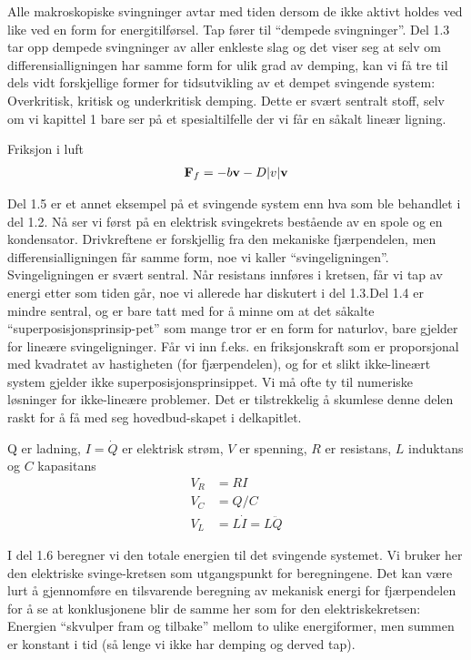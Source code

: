 \documentclass[12pt]{article}
\numberwithin{equation}{section}
\numberwithin{figure}{section}
\DeclarePairedDelimiter\abs{\lvert}{\rvert}%
\newcommand{\ma}[1]{$#1$}
\newcommand{\eq}[1]{{\small\begin{align}#1\end{align}}}
\renewcommand\vec[1]{\mathbf{#1}}
\begin{document}
Alle makroskopiske svingninger avtar med tiden dersom de ikke aktivt holdes ved like ved en form for energitilførsel. Tap fører til “dempede svingninger”. Del 1.3 tar opp dempede svingninger av aller enkleste slag og det viser seg at selv om differensialligningen har samme form for ulik grad av demping, kan vi få tre til dels vidt forskjellige former for tidsutvikling av et dempet svingende system: Overkritisk, kritisk og underkritisk demping. Dette er svært sentralt stoff, selv om vi kapittel 1 bare ser på et spesialtilfelle der vi får en såkalt lineær ligning. 

\begin{tcolorbox}[title = Del 1.3 -- Dempede svinginger,breakable]
   Friksjon i luft
  \eq{\vec F_f = -b\vec v- D\abs v \vec v }
\end{tcolorbox}

Del 1.5 er et annet eksempel på et svingende system enn hva som ble behandlet i del 1.2. Nå ser vi først på en elektrisk svingekrets bestående av en spole og en kondensator. Drivkreftene er forskjellig fra den mekaniske fjærpendelen, men differensialligningen får samme form, noe vi kaller “svingeligningen”. Svingeligningen er svært sentral. Når resistans innføres i kretsen, får vi tap av energi etter som tiden går, noe vi allerede har diskutert i del 1.3.Del 1.4 er mindre sentral, og er bare tatt med for å minne om at det såkalte “superposisjonsprinsip-pet” som mange tror er en form for naturlov, bare gjelder for lineære svingeligninger. Får vi inn f.eks. en friksjonskraft som er proporsjonal med kvadratet av hastigheten (for fjærpendelen),  og for et slikt ikke-lineært system gjelder ikke superposisjonsprinsippet. Vi må ofte ty til numeriske løsninger for ikke-lineære problemer. Det er tilstrekkelig å skumlese denne delen raskt for å få med seg hovedbud-skapet i delkapitlet.

\begin{tcolorbox}[title = Del 1.5 -- Elektriske svingninger,breakable]
   Q er ladning, \ma{I=\dot Q} 
   er elektrisk strøm, \ma V er spenning, \ma R er resistans, \ma L 
   induktans og \ma C kapasitans
  \eq{V_R &= RI\\
  V_C &= Q/C\\
  V_L &=  L \dot I = L \ddot Q}
\end{tcolorbox}

I del 1.6 beregner vi den totale energien til det svingende systemet. Vi bruker her den elektriske svinge-kretsen som utgangspunkt for beregningene. Det kan være lurt å gjennomføre en tilsvarende beregning av mekanisk energi for fjærpendelen for å se at konklusjonene blir de samme her som for den elektriskekretsen: Energien “skvulper fram og tilbake” mellom to ulike energiformer, men summen er konstant i tid (så lenge vi ikke har demping og derved tap).
\end{document}
